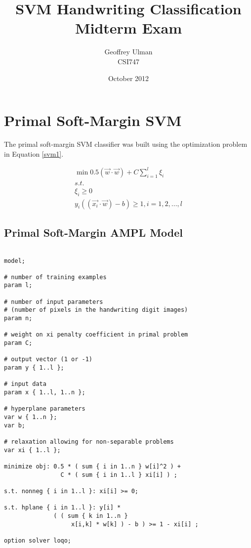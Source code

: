\documentclass{article}
\begin{document}
\title{SVM Handwriting Classification\\
       Midterm Exam}
\author{Geoffrey Ulman\\
        CSI747}
\date{October 2012}
\maketitle

\section{Primal Soft-Margin SVM}\label{model1}

The primal soft-margin SVM classifier was built using the optimization problem in Equation \ref{svm1}.

\begin{equation}\label{svm1}
\begin{split}
\min 0.5\left( \vec{w} \cdot \vec{w} \right) + C \sum_{i=1}^l \xi_i \\
s.t. \\
\xi_i \ge 0 \\
y_i \left( \left( \vec{x_i} \cdot \vec{w} \right) - b \right) \ge 1 , i = 1,2,...,l
\end{split}
\end{equation}

\subsection{Primal Soft-Margin AMPL Model}

\begin{verbatim}

model;

# number of training examples
param l;

# number of input parameters
# (number of pixels in the handwriting digit images)
param n;

# weight on xi penalty coefficient in primal problem
param C;

# output vector (1 or -1)
param y { 1..l };

# input data
param x { 1..l, 1..n };

# hyperplane parameters
var w { 1..n };
var b;

# relaxation allowing for non-separable problems
var xi { 1..l };

minimize obj: 0.5 * ( sum { i in 1..n } w[i]^2 ) +
                C * ( sum { i in 1..l } xi[i] ) ;

s.t. nonneg { i in 1..l }: xi[i] >= 0;

s.t. hplane { i in 1..l }: y[i] *
              ( ( sum { k in 1..n }
                   x[i,k] * w[k] ) - b ) >= 1 - xi[i] ;

option solver loqo;

\end{verbatim}
\end{document}

